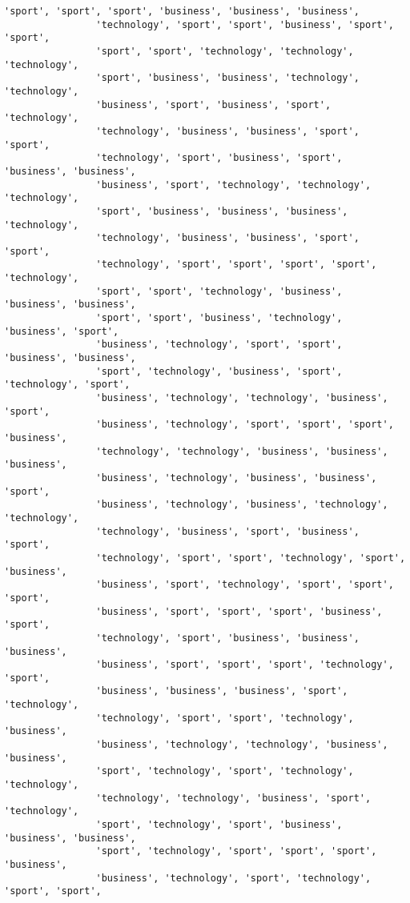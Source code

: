 \documentclass[11pt]{article}
\begin{document}
\begin{Verbatim}[commandchars=\\\{\}]
                'sport', 'sport', 'sport', 'business', 'business', 'business',
                'technology', 'sport', 'sport', 'business', 'sport', 'sport',
                'sport', 'sport', 'technology', 'technology', 'technology',
                'sport', 'business', 'business', 'technology', 'technology',
                'business', 'sport', 'business', 'sport', 'technology',
                'technology', 'business', 'business', 'sport', 'sport',
                'technology', 'sport', 'business', 'sport', 'business', 'business',
                'business', 'sport', 'technology', 'technology', 'technology',
                'sport', 'business', 'business', 'business', 'technology',
                'technology', 'business', 'business', 'sport', 'sport',
                'technology', 'sport', 'sport', 'sport', 'sport', 'technology',
                'sport', 'sport', 'technology', 'business', 'business', 'business',
                'sport', 'sport', 'business', 'technology', 'business', 'sport',
                'business', 'technology', 'sport', 'sport', 'business', 'business',
                'sport', 'technology', 'business', 'sport', 'technology', 'sport',
                'business', 'technology', 'technology', 'business', 'sport',
                'business', 'technology', 'sport', 'sport', 'sport', 'business',
                'technology', 'technology', 'business', 'business', 'business',
                'business', 'technology', 'business', 'business', 'sport',
                'business', 'technology', 'business', 'technology', 'technology',
                'technology', 'business', 'sport', 'business', 'sport',
                'technology', 'sport', 'sport', 'technology', 'sport', 'business',
                'business', 'sport', 'technology', 'sport', 'sport', 'sport',
                'business', 'sport', 'sport', 'sport', 'business', 'sport',
                'technology', 'sport', 'business', 'business', 'business',
                'business', 'sport', 'sport', 'sport', 'technology', 'sport',
                'business', 'business', 'business', 'sport', 'technology',
                'technology', 'sport', 'sport', 'technology', 'business',
                'business', 'technology', 'technology', 'business', 'business',
                'sport', 'technology', 'sport', 'technology', 'technology',
                'technology', 'technology', 'business', 'sport', 'technology',
                'sport', 'technology', 'sport', 'business', 'business', 'business',
                'sport', 'technology', 'sport', 'sport', 'sport', 'business',
                'business', 'technology', 'sport', 'technology', 'sport', 'sport',

\end{Verbatim}
\end{document}
